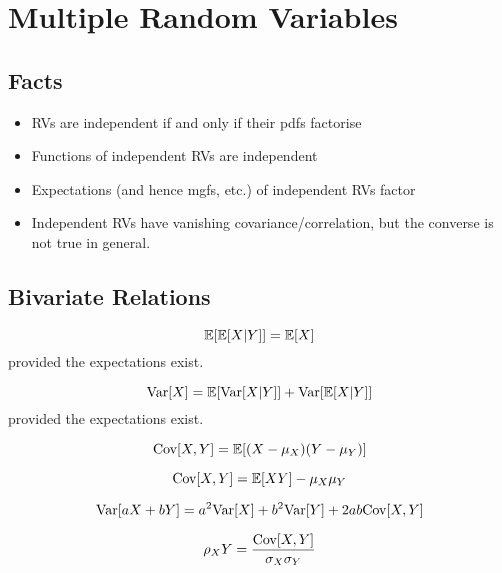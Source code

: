 \section{Multiple Random Variables}

\subsection{Facts}
\begin{itemize}[+]
    \item RVs are independent if and only if their pdfs factorise
    \item Functions of independent RVs are independent
    \item Expectations (and hence mgfs, etc.) of independent RVs factor
    \item Independent RVs have vanishing covariance/correlation, but the converse is not true in general.
\end{itemize}

\subsection{Bivariate Relations}
\begin{theorem}
    \[
        \mathbb{E}{}[\mathbb{E}{}[X|Y]] = \mathbb{E}{}[X]
    \]
    provided the expectations exist.
\end{theorem}

\begin{theorem}
    \[
        \text{Var}{}[X] = \mathbb{E}{}[\text{Var}{}[X \vert{} Y]] + \text{Var}{}[\mathbb{E}{}[X \vert{} Y]]
    \]
    provided the expectations exist.
\end{theorem}

\begin{definition}[Covariance]
    \[
        \text{Cov}{}[X, Y] = \mathbb{E}{}[(X - \mu_X)(Y - \mu_Y)]
    \]
\end{definition}

\begin{theorem}
    \[
        \text{Cov}{}[X, Y] = \mathbb{E}{}[XY] - \mu_X\mu_Y
    \]
\end{theorem}

\begin{theorem}
    \[
        \text{Var}[aX + bY] = a^2\text{Var}{}[X] + b^2\text{Var}{}[Y] + 2ab\text{Cov}[X, Y]
    \]
\end{theorem}

\begin{definition}[Correlation]
    \[
        \rho_XY = \frac{\text{Cov}[X, Y]}{\sigma_X \sigma_Y}
    \]
\end{definition}

